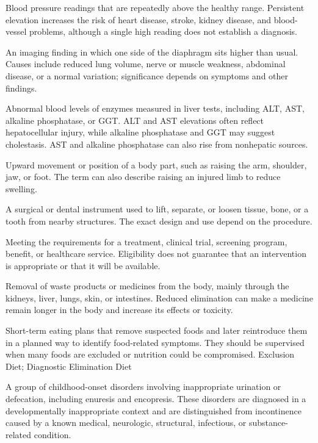  Blood pressure readings that are repeatedly above the healthy range. Persistent elevation increases the risk of heart disease, stroke, kidney disease, and blood-vessel problems, although a single high reading does not establish a diagnosis.

 An imaging finding in which one side of the diaphragm sits higher than usual. Causes include reduced lung volume, nerve or muscle weakness, abdominal disease, or a normal variation; significance depends on symptoms and other findings.

 Abnormal blood levels of enzymes measured in liver tests, including ALT, AST, alkaline phosphatase, or GGT. ALT and AST elevations often reflect hepatocellular injury, while alkaline phosphatase and GGT may suggest cholestasis. AST and alkaline phosphatase can also rise from nonhepatic sources.

 Upward movement or position of a body part, such as raising the arm, shoulder, jaw, or foot. The term can also describe raising an injured limb to reduce swelling.

 A surgical or dental instrument used to lift, separate, or loosen tissue, bone, or a tooth from nearby structures. The exact design and use depend on the procedure.

 Meeting the requirements for a treatment, clinical trial, screening program, benefit, or healthcare service. Eligibility does not guarantee that an intervention is appropriate or that it will be available.

 Removal of waste products or medicines from the body, mainly through the kidneys, liver, lungs, skin, or intestines. Reduced elimination can make a medicine remain longer in the body and increase its effects or toxicity.

 Short-term eating plans that remove suspected foods and later reintroduce them in a planned way to identify food-related symptoms. They should be supervised when many foods are excluded or nutrition could be compromised.
\synonyms
Exclusion Diet; Diagnostic Elimination Diet

 A group of childhood-onset disorders involving inappropriate urination or defecation, including enuresis and encopresis. These disorders are diagnosed in a developmentally inappropriate context and are distinguished from incontinence caused by a known medical, neurologic, structural, infectious, or substance-related condition.

